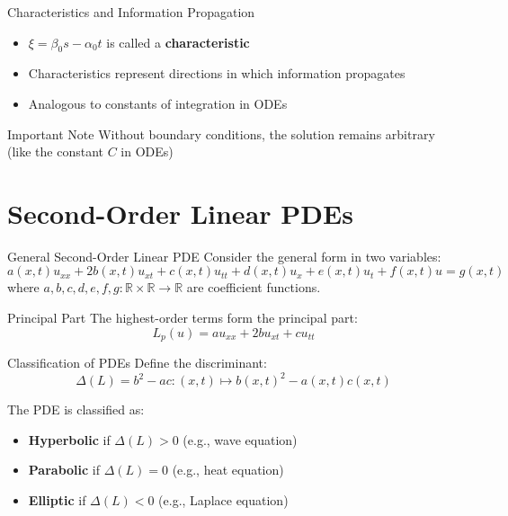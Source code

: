 \documentclass{beamer}
\begin{document}
\begin{frame}{Characteristics and Information Propagation}
    \begin{itemize}
        \item $\xi = \beta_0s - \alpha_0t$ is called a \textbf{characteristic}
        \item Characteristics represent directions in which information propagates
        \item Analogous to constants of integration in ODEs
    \end{itemize}
    
    \begin{alertblock}{Important Note}
        Without boundary conditions, the solution remains arbitrary (like the constant $C$ in ODEs)
    \end{alertblock}
\end{frame}


\section{Second-Order Linear PDEs}

\begin{frame}{General Second-Order Linear PDE}
    Consider the general form in two variables:
    \[
    a(x,t)u_{xx} + 2b(x,t)u_{xt} + c(x,t)u_{tt} + d(x,t)u_x + e(x,t)u_t + f(x,t)u = g(x,t)
    \]
    where $a,b,c,d,e,f,g: \mathbb{R} \times \mathbb{R} \rightarrow \mathbb{R}$ are coefficient functions.
    
    \begin{block}{Principal Part}
        The highest-order terms form the principal part:
        \[
        L_p(u) = a u_{xx} + 2b u_{xt} + c u_{tt}
        \]
    \end{block}
\end{frame}

\begin{frame}{Classification of PDEs}
    Define the discriminant:
    \[
    \Delta(L) = b^2 - ac : (x,t) \mapsto b(x,t)^2 - a(x,t)c(x,t)
    \]
    
    The PDE is classified as:
    \begin{itemize}
        \item \textbf{Hyperbolic} if $\Delta(L) > 0$ (e.g., wave equation)
        \item \textbf{Parabolic} if $\Delta(L) = 0$ (e.g., heat equation)
        \item \textbf{Elliptic} if $\Delta(L) < 0$ (e.g., Laplace equation)
    \end{itemize}
\end{frame}
\end{document}
